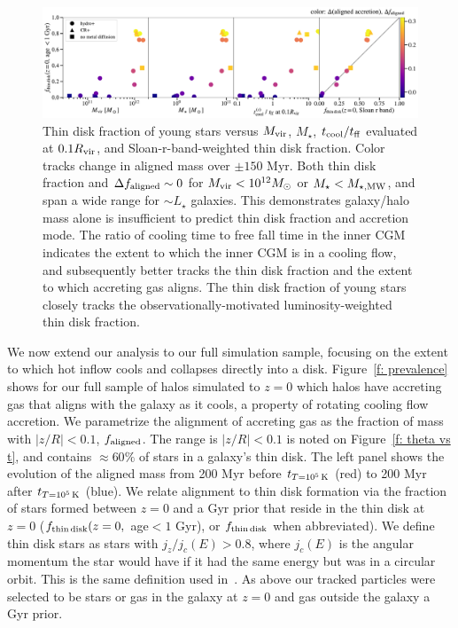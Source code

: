 \documentclass[fleqn,usenatbib]{mnras}
\newcommand{\tcon}{t_{T=10^5\,{\rm K}}}
\begin{document}
\begin{figure}
    \centering
    \includegraphics[width=\textwidth]{figures/prevalence/aligned_fraction_vs_galaxy_props.pdf}
    \caption{
    Thin disk fraction of young stars versus $M_{\rm vir}$, $M_\star$, $t_{\rm cool}/t_{\rm ff}$ evaluated at $0.1 R_{\rm vir}$, and Sloan-r-band-weighted thin disk fraction.
    Color tracks change in aligned mass over $\pm 150$ Myr.
    Both thin disk fraction and $\Delta f_{\rm aligned} \sim 0$ for $M_{\rm vir} < 10^{12} M_\odot$ or $M_\star < M_{\star, {\rm MW}}$, and span a wide range for $\sim L_\star$ galaxies.
    This demonstrates galaxy/halo mass alone is insufficient to predict thin disk fraction and accretion mode.
    The ratio of cooling time to free fall time in the inner CGM indicates the extent to which the inner CGM is in a cooling flow, and subsequently better tracks the thin disk fraction and the extent to which accreting gas aligns.
    The thin disk fraction of young stars closely tracks the observationally-motivated luminosity-weighted thin disk fraction.
    }
    \label{f: prevalence vs galaxy properties}
\end{figure}

We now extend our analysis to our full simulation sample, focusing on the extent to which hot inflow cools and collapses directly into a disk.
Figure~\ref{f: prevalence} shows for our full sample of halos simulated to $z=0$ which halos have accreting gas that aligns with the galaxy as it cools, a property of rotating cooling flow accretion.
We parametrize the alignment of accreting gas as the fraction of mass with $\vert z/R \vert < 0.1$, $f_{\rm aligned}$.
The range is $\vert z/R \vert < 0.1$ is noted on Figure~\ref{f: theta vs t}, and contains $\approx 60\%$ of stars in a galaxy's thin disk.
The left panel shows the evolution of the aligned mass from 200 Myr before $\tcon$ (red) to 200 Myr after $\tcon$ (blue).
We relate alignment to thin disk formation via the fraction of stars formed between $z=0$ and a Gyr prior that reside in the thin disk at $z=0$ ($f_{\rm thin\,disk}(z=0,$ age$<1$ Gyr), or $f_{\rm thin\,disk}$ when abbreviated).
We define thin disk stars as stars with $j_z/j_c(E) > 0.8$, where $j_c(E)$ is the angular momentum the star would have if it had the same energy but was in a circular orbit.
This is the same definition used in~\cite{Yu2021}.
As above our tracked particles were selected to be stars or gas in the galaxy at $z=0$ and gas outside the galaxy a Gyr prior.
\end{document}
